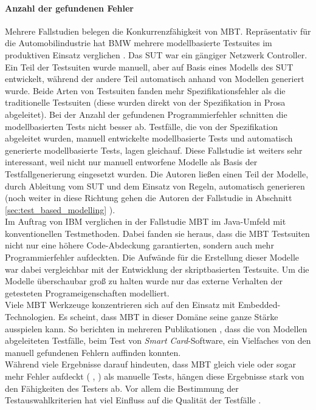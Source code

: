\paragraph{Anzahl der gefundenen Fehler} Mehrere Fallstudien belegen die Konkurrenzfähigkeit von MBT. Repräsentativ für die Automobilindustrie hat BMW mehrere modellbasierte Testsuites im produktiven Einsatz verglichen \cite{pretschner_one_2005}. Das \Gls{SUT} war ein gängiger Netzwerk Controller. Ein Teil der Testsuiten wurde manuell, aber auf Basis eines Modells des \Gls{SUT} entwickelt, während der andere Teil automatisch anhand von Modellen generiert wurde. Beide Arten von Testsuiten fanden mehr Spezifikationsfehler als die traditionelle Testsuiten (diese wurden direkt von der Spezifikation in Prosa abgeleitet). Bei der Anzahl der gefundenen Programmierfehler schnitten die modellbasierten Tests nicht besser ab. Testfälle, die von der Spezifikation abgeleitet wurden, manuell entwickelte modellbasierte Tests und automatisch generierte modellbasierte Tests, lagen gleichauf. Diese Fallstudie ist weiters sehr interessant, weil nicht nur manuell entworfene Modelle als Basis der Testfallgenerierung eingesetzt wurden. Die Autoren ließen einen Teil der Modelle, durch Ableitung vom \Gls{SUT} und dem Einsatz von Regeln, automatisch generieren (noch weiter in diese Richtung gehen die Autoren der Fallstudie in Abschnitt \ref{sec:test_based_modelling} ).\\
Im Auftrag von IBM verglichen \citeauthor{farchi_using_2002} in der Fallstudie \cite{farchi_using_2002} \Gls{MBT} im Java-Umfeld mit konventionellen Testmethoden. Dabei fanden sie heraus, dass die \Gls{MBT} Testsuiten nicht nur eine höhere Code-Abdeckung garantierten, sondern auch mehr Programmierfehler aufdeckten. Die Aufwände für die Erstellung dieser Modelle war dabei vergleichbar mit der Entwicklung der skriptbasierten Testsuite. Um die Modelle überschaubar groß zu halten wurde nur das externe Verhalten der getesteten Programeigenschaften modelliert.\\
Viele \Gls{MBT} Werkzeuge konzentrieren sich auf den Einsatz mit Embedded-Technologien. Es scheint, dass \Gls{MBT} in dieser Domäne seine ganze Stärke ausspielen kann. So berichten \citeauthor{legeard_generation_2001} in mehreren Publikationen \cite{legeard_generation_2001}, dass die von Modellen abgeleiteten Testfälle, beim Test von \textit{Smart Card}-Software, ein Vielfaches von den manuell gefundenen Fehlern auffinden konnten.\\
Während viele Ergebnisse darauf hindeuten, dass \Gls{MBT} gleich viele oder sogar mehr Fehler aufdeckt ( \cite{dalal_model-based_1999}, \cite{legeard_generation_2001}) als manuelle Tests, hängen diese Ergebnisse stark von den Fähigkeiten des Testers ab. Vor allem die Bestimmung der Testauswahlkriterien hat viel Einfluss auf die Qualität der Testfälle \cite{utting_practical_2007}.

